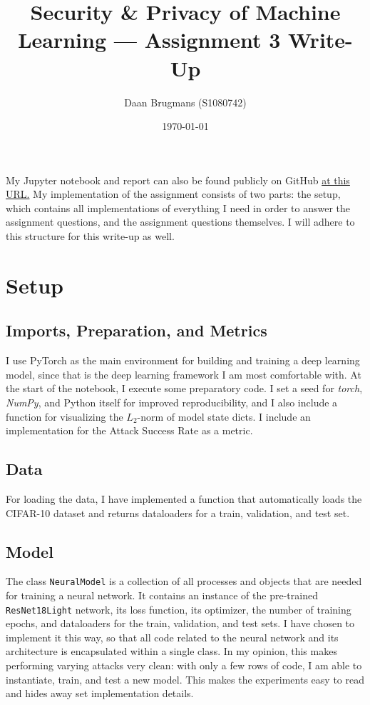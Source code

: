 \documentclass{article}
\begin{document}
\title{Security \& Privacy of Machine Learning --- Assignment 3 Write-Up}
\author{Daan Brugmans (S1080742)}
\date{\today}

\maketitle

My Jupyter notebook and report can also be found publicly on GitHub \href{https://github.com/daanbrugmans/ru-security-and-privacy-of-machine-learning-23-24/tree/main/assignments/assignment-3}{at this URL.}
My implementation of the assignment consists of two parts: the setup, which contains all implementations of everything I need in order to answer the assignment questions, and the assignment questions themselves.
I will adhere to this structure for this write-up as well.

\section{Setup}
\subsection{Imports, Preparation, and Metrics}
I use PyTorch as the main environment for building and training a deep learning model, since that is the deep learning framework I am most comfortable with. 
At the start of the notebook, I execute some preparatory code.
I set a seed for \textit{torch}, \textit{NumPy}, and Python itself for improved reproducibility, and I also include a function for visualizing the $L_2$-norm of model state dicts.
I include an implementation for the Attack Success Rate as a metric.

\subsection{Data}
For loading the data, I have implemented a function that automatically loads the CIFAR-10 dataset and returns dataloaders for a train, validation, and test set.

\subsection{Model}
The class \texttt{NeuralModel} is a collection of all processes and objects that are needed for training a neural network.
It contains an instance of the pre-trained \texttt{ResNet18Light} network, its loss function, its optimizer, the number of training epochs, and dataloaders for the train, validation, and test sets.
I have chosen to implement it this way, so that all code related to the neural network and its architecture is encapsulated within a single class.
In my opinion, this makes performing varying attacks very clean: with only a few rows of code, I am able to instantiate, train, and test a new model.
This makes the experiments easy to read and hides away set implementation details.
\end{document}
